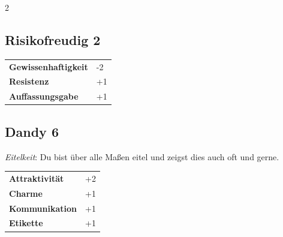 \begin{multicols}{2}
\begin{tcolorbox}

\end{tcolorbox}

\begin{tcolorbox}
    \subsection*{Risikofreudig \hfill \small{2 }}
    \tcblower




\begin{tabular}{@{}ll@{}}
    \textbf{Gewissenhaftigkeit} & -2\\
    \textbf{Resistenz} & +1\\
    \textbf{Auffassungsgabe} & +1\\
\end{tabular}


\end{tcolorbox}

\begin{tcolorbox}
    \subsection*{Dandy \hfill \small{6 }}
    \tcblower
\textit{Eitelkeit}: Du bist über alle Maßen eitel und zeigst dies auch oft und gerne.


\vspace{3mm}

\begin{tabular}{@{}ll@{}}
    \textbf{Attraktivität} & +2\\
    \textbf{Charme} & +1\\
    \textbf{Kommunikation} & +1\\
    \textbf{Etikette} & +1\\
\end{tabular}


\end{tcolorbox}

\begin{tcolorbox}

\end{tcolorbox}
\end{multicols}
